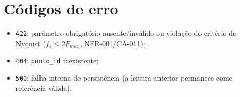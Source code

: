 \section{Códigos de erro}

\begin{itemize}
  \item \texttt{422}: parâmetro obrigatório ausente/inválido ou violação do
  critério de Nyquist (\(f_s \le 2F_{max}\), NFR-001/CA-011);
  \item \texttt{404}: \texttt{ponto\_id} inexistente;
  \item \texttt{500}: falha interna de persistência (a leitura anterior
  permanece como referência válida).
\end{itemize}
